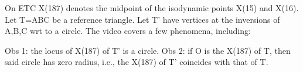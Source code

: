On ETC X(187) denotes the midpoint of the isodynamic points X(15) and X(16). Let T=ABC be a reference triangle. Let T' have vertices at the inversions of A,B,C wrt to a circle. The video covers a few phenomena, including:

Obs 1: the locus of X(187) of T' is a circle.
Obs 2: if O is the X(187) of T, then said circle has zero radius, i.e., the X(187) of T' coincides with that of T.